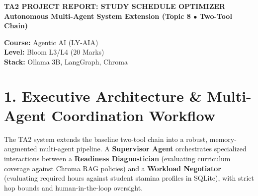 \documentclass[10pt,a4paper]{article}
\begin{document}

\begin{tcolorbox}[enhanced, colback=primary, colframe=primary, arc=4pt, left=8pt, right=8pt, top=5pt, bottom=5pt]
\begin{minipage}{0.72\textwidth}
  {\fontsize{13pt}{15pt}\bfseries\color{white} TA2 PROJECT REPORT: STUDY SCHEDULE OPTIMIZER}\\[2pt]
  {\small\color{tagblue}\textbf{Autonomous Multi-Agent System Extension (Topic 8 $\bullet$ Two-Tool Chain)}}
\end{minipage}
\hfill
\begin{minipage}{0.26\textwidth}
  \raggedleft
  {\footnotesize\color{white} \textbf{Course:} Agentic AI (LY-AIA)\\
  \textbf{Level:} Bloom L3/L4 (20 Marks)\\
  \textbf{Stack:} Ollama 3B, LangGraph, Chroma}
\end{minipage}
\end{tcolorbox}

\vspace{-2pt}
\section*{\large \color{primary} 1. Executive Architecture \& Multi-Agent Coordination Workflow}
\vspace{-2pt}
The TA2 system extends the baseline two-tool chain into a robust, memory-augmented multi-agent pipeline. A \textbf{Supervisor Agent} orchestrates specialized interactions between a \textbf{Readiness Diagnostician} (evaluating curriculum coverage against Chroma RAG policies) and a \textbf{Workload Negotiator} (evaluating required hours against student stamina profiles in SQLite), with strict hop bounds and human-in-the-loop oversight.
\end{document}
